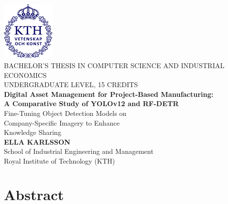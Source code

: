 \documentclass[a4paper,10pt,twocolumn]{article}
\numberwithin{figure}{section}
\numberwithin{table}{section}
\begin{document}
\clearpage
{}  %

\setlength{\headheight}{14.5pt}
\begin{titlepage}
    \centering
    \includegraphics[width=0.2\textwidth]{kthLogga.png}\\[1cm]
    {\large BACHELOR’S THESIS IN COMPUTER SCIENCE AND INDUSTRIAL ECONOMICS}\\[0.5cm]
    {\large UNDERGRADUATE LEVEL, 15 CREDITS}\\[2.5cm]
    
    \linespread{0.9}\selectfont %
    {\Huge \textbf{Digital Asset Management for Project-Based Manufacturing: \\ 
    A Comparative Study of YOLOv12 and RF-DETR}}\\[0.7cm]
    {\Large Fine-Tuning Object Detection Models on \\ Company-Specific Imagery 
    to Enhance \\ Knowledge Sharing}\\[1cm]
    \vfill
    {\large \textbf{ELLA KARLSSON}}\\[1cm]
    \vfill
    {\large School of Industrial Engineering and Management}\\
    {\large Royal Institute of Technology (KTH)}\\
\end{titlepage}


\newpage
{}
\onecolumn
{} 
\section*{Abstract}
\end{document}
